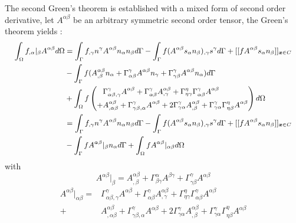 The second Green's theorem is established with a mixed form of second order derivative, let $A^{\alpha\beta}$ be an arbitrary symmetric second order tensor, the Green's theorem yields \cite{benzaken2021}:
\begin{equation}\small
\begin{split}
\int_\Omega f_{,\alpha}\vert_\beta A^{\alpha\beta} d\Omega &= 
\int_\Gamma f_{,\gamma} n^\gamma A^{\alpha\beta} n_\alpha n_\beta d\Gamma 
- \int_\Gamma f(A^{\alpha\beta}s_\alpha n_\beta)_{,\gamma} s^\gamma d\Gamma
+ [[f A^{\alpha\beta} s_\alpha n_\beta]]_{\boldsymbol x \in C} \\
&- \int_\Gamma f(A^{\alpha\beta}_{,\beta}n_\alpha + \Gamma^\gamma_{\alpha\beta}A^{\alpha\beta}n_\gamma + \Gamma^\gamma_{\gamma\beta} A^{\alpha\beta} n_\alpha) d\Gamma \\
&+ \int_\Omega f \left (
\begin{split}
&\Gamma^\gamma_{\alpha\beta,\gamma}A^{\alpha\beta} + \Gamma^\gamma_{\alpha\beta} A^{\alpha\beta}_{,\gamma} + \Gamma^\eta_{\eta\gamma}\Gamma^\gamma_{\alpha\beta} A^{\alpha\beta} \\
+ &A^{\alpha\beta}_{,\alpha\beta} + \Gamma^\gamma_{\gamma\beta,\alpha}A^{\alpha\beta}+2\Gamma^\gamma_{\gamma\alpha}A^{\alpha\beta}_{,\beta} + \Gamma^{\gamma}_{\gamma\alpha}\Gamma^\eta_{\eta\beta} A^{\alpha\beta}
\end{split}
\right ) d\Omega \\
&=\int_\Gamma f_{,\gamma} n^\gamma A^{\alpha\beta} n_\alpha n_\beta d\Gamma 
- \int_\Gamma f(A^{\alpha\beta}s_\alpha n_\beta)_{,\gamma} s^\gamma d\Gamma
+ [[f A^{\alpha\beta} s_\alpha n_\beta]]_{\boldsymbol x \in C} \\
&-\int_\Gamma f A^{\alpha\beta}\vert_\beta n_\alpha d\Gamma
+ \int_\Omega f A^{\alpha\beta}\vert_{\alpha\beta} d\Omega
\end{split}
\end{equation}
with
\begin{equation}
A^{\alpha\beta}\vert_\beta = A^{\alpha\beta}_{,\beta} + \Gamma^\alpha_{\beta\gamma}A^{\beta\gamma} + \Gamma^\gamma_{\gamma\beta} A^{\alpha\beta}
\end{equation}
\begin{equation}
\begin{split}
A^{\alpha\beta}\vert_{\alpha\beta} = &\Gamma^\gamma_{\alpha\beta,\gamma}A^{\alpha\beta} + \Gamma^\gamma_{\alpha\beta} A^{\alpha\beta}_{,\gamma} + \Gamma^\eta_{\eta\gamma}\Gamma^\gamma_{\alpha\beta} A^{\alpha\beta} \\
+ &A^{\alpha\beta}_{,\alpha\beta} + \Gamma^\gamma_{\gamma\beta,\alpha}A^{\alpha\beta}+2\Gamma^\gamma_{\gamma\alpha}A^{\alpha\beta}_{,\beta} + \Gamma^{\gamma}_{\gamma\alpha}\Gamma^\eta_{\eta\beta} A^{\alpha\beta}
\end{split}
\end{equation}

